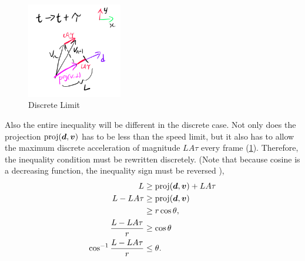 
\begin{figure}
    \includegraphics[width=0.37\textwidth,right]{assets/discrete_limit.png}
    \caption{Discrete Limit}
    \label{fig:discrete_limit}
\end{figure}

Also the entire inequality will be different in the discrete case. Not only does the projection $\text{proj}(\boldsymbol{d}, \boldsymbol{v})$ has to be less than the speed limit, but it also has to allow the maximum discrete acceleration of magnitude $LA\tau$ every frame (\ref{fig:discrete_limit}). Therefore, the inequality condition must be rewritten discretely. (Note that because cosine is a decreasing function, the inequality sign must be reversed \parencite{ineqcosine}),
\begin{align*}
    L &\ge \text{proj}(\boldsymbol{d}, \boldsymbol{v}) + LA\tau\\
    L - LA\tau &\ge \text{proj}(\boldsymbol{d}, \boldsymbol{v})\\
    &\ge r \cos \theta,\\
    \frac{L - LA\tau}{r} &\ge \cos \theta\\
    \cos^{-1} \frac{L - LA\tau}{r} &\le \theta.
\end{align*}

